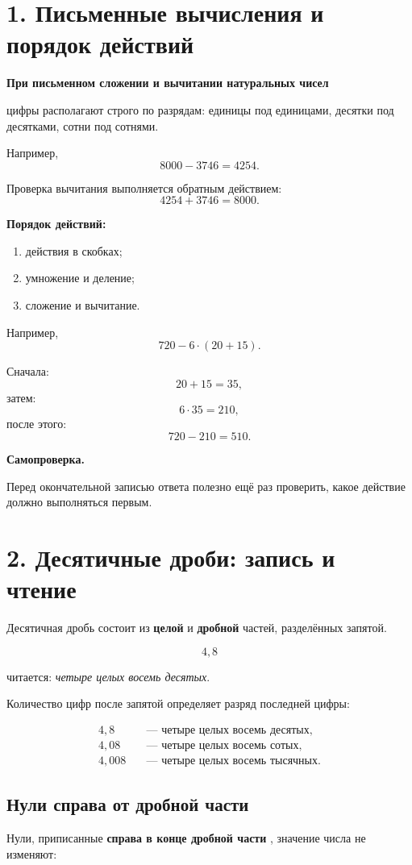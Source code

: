 \documentclass[a4paper,12pt]{article}
\newcommand{\sectiontitle}[1]{%
  \section*{\color{darkaccent}#1}%
}
\newcommand{\important}[1]{%
  \textbf{\color{darkaccent}#1}%
}
\begin{document}
\sectiontitle{1. Письменные вычисления и порядок действий}

\important{При письменном сложении и вычитании натуральных чисел}
цифры располагают строго по разрядам:
единицы под единицами, десятки под десятками, сотни под сотнями.

Например,
\[
8000-3746=4254.
\]

Проверка вычитания выполняется обратным действием:
\[
4254+3746=8000.
\]

\important{Порядок действий:}

\begin{enumerate}
  \item действия в скобках;
  \item умножение и деление;
  \item сложение и вычитание.
\end{enumerate}

Например,
\[
720-6\cdot(20+15).
\]

Сначала:
\[
20+15=35,
\]
затем:
\[
6\cdot35=210,
\]
после этого:
\[
720-210=510.
\]

\important{Самопроверка.}
Перед окончательной записью ответа полезно ещё раз проверить,
какое действие должно выполняться первым.


\sectiontitle{2. Десятичные дроби: запись и чтение}

Десятичная дробь состоит из \important{целой} и
\important{дробной} частей, разделённых запятой.

\[
4{,}8
\]

читается: \textit{четыре целых восемь десятых}.

Количество цифр после запятой определяет разряд последней цифры:

\[
\begin{aligned}
4{,}8   &\quad \text{--- четыре целых восемь десятых},\\
4{,}08  &\quad \text{--- четыре целых восемь сотых},\\
4{,}008 &\quad \text{--- четыре целых восемь тысячных}.
\end{aligned}
\]

\subsection*{\color{accent}Нули справа от дробной части}

Нули, приписанные \important{справа в конце дробной части},
значение числа не изменяют:
\end{document}
